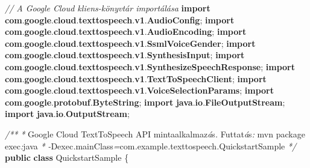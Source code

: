 \documentclass[
]{article}
\newenvironment{Shaded}{}{}
\newcommand{\CommentTok}[1]{\textcolor[rgb]{0.38,0.63,0.69}{\textit{#1}}}
\newcommand{\ImportTok}[1]{\textcolor[rgb]{0.00,0.50,0.00}{\textbf{#1}}}
\newcommand{\KeywordTok}[1]{\textcolor[rgb]{0.00,0.44,0.13}{\textbf{#1}}}
\newcommand{\NormalTok}[1]{#1}
\newcommand{\OperatorTok}[1]{\textcolor[rgb]{0.40,0.40,0.40}{#1}}
\begin{document}
\begin{Shaded}
\begin{Highlighting}[]
\CommentTok{// A Google Cloud kliens{-}könyvtár importálása}
\KeywordTok{import} \ImportTok{com}\OperatorTok{.}\ImportTok{google}\OperatorTok{.}\ImportTok{cloud}\OperatorTok{.}\ImportTok{texttospeech}\OperatorTok{.}\ImportTok{v1}\OperatorTok{.}\ImportTok{AudioConfig}\OperatorTok{;}
\KeywordTok{import} \ImportTok{com}\OperatorTok{.}\ImportTok{google}\OperatorTok{.}\ImportTok{cloud}\OperatorTok{.}\ImportTok{texttospeech}\OperatorTok{.}\ImportTok{v1}\OperatorTok{.}\ImportTok{AudioEncoding}\OperatorTok{;}
\KeywordTok{import} \ImportTok{com}\OperatorTok{.}\ImportTok{google}\OperatorTok{.}\ImportTok{cloud}\OperatorTok{.}\ImportTok{texttospeech}\OperatorTok{.}\ImportTok{v1}\OperatorTok{.}\ImportTok{SsmlVoiceGender}\OperatorTok{;}
\KeywordTok{import} \ImportTok{com}\OperatorTok{.}\ImportTok{google}\OperatorTok{.}\ImportTok{cloud}\OperatorTok{.}\ImportTok{texttospeech}\OperatorTok{.}\ImportTok{v1}\OperatorTok{.}\ImportTok{SynthesisInput}\OperatorTok{;}
\KeywordTok{import} \ImportTok{com}\OperatorTok{.}\ImportTok{google}\OperatorTok{.}\ImportTok{cloud}\OperatorTok{.}\ImportTok{texttospeech}\OperatorTok{.}\ImportTok{v1}\OperatorTok{.}\ImportTok{SynthesizeSpeechResponse}\OperatorTok{;}
\KeywordTok{import} \ImportTok{com}\OperatorTok{.}\ImportTok{google}\OperatorTok{.}\ImportTok{cloud}\OperatorTok{.}\ImportTok{texttospeech}\OperatorTok{.}\ImportTok{v1}\OperatorTok{.}\ImportTok{TextToSpeechClient}\OperatorTok{;}
\KeywordTok{import} \ImportTok{com}\OperatorTok{.}\ImportTok{google}\OperatorTok{.}\ImportTok{cloud}\OperatorTok{.}\ImportTok{texttospeech}\OperatorTok{.}\ImportTok{v1}\OperatorTok{.}\ImportTok{VoiceSelectionParams}\OperatorTok{;}
\KeywordTok{import} \ImportTok{com}\OperatorTok{.}\ImportTok{google}\OperatorTok{.}\ImportTok{protobuf}\OperatorTok{.}\ImportTok{ByteString}\OperatorTok{;}
\KeywordTok{import} \ImportTok{java}\OperatorTok{.}\ImportTok{io}\OperatorTok{.}\ImportTok{FileOutputStream}\OperatorTok{;}
\KeywordTok{import} \ImportTok{java}\OperatorTok{.}\ImportTok{io}\OperatorTok{.}\ImportTok{OutputStream}\OperatorTok{;}

\CommentTok{/**}
 \CommentTok{*}\NormalTok{ Google Cloud TextToSpeech API mintaalkalmaz}\CommentTok{á}\NormalTok{s}\CommentTok{. }\NormalTok{Futtat}\CommentTok{á}\NormalTok{s}\CommentTok{:}\NormalTok{ mvn package exec}\CommentTok{:}\NormalTok{java}
 \CommentTok{*}  \CommentTok{{-}}\NormalTok{Dexec}\CommentTok{.}\NormalTok{mainClass}\CommentTok{=\textquotesingle{}}\NormalTok{com}\CommentTok{.}\NormalTok{example}\CommentTok{.}\NormalTok{texttospeech}\CommentTok{.}\NormalTok{QuickstartSample}\CommentTok{\textquotesingle{}}
 \CommentTok{*/}
\KeywordTok{public} \KeywordTok{class}\NormalTok{ QuickstartSample }\OperatorTok{\{}


\end{Highlighting}
\end{Shaded}
\end{document}
